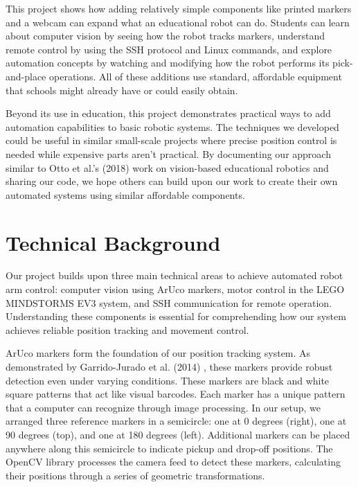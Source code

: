 \documentclass[10pt,twocolumn]{article}
\begin{document}
This project shows how adding relatively simple components like printed markers and a webcam can expand what an educational robot can do. Students can learn about computer vision by seeing how the robot tracks markers, understand remote control by using the SSH protocol and Linux commands, and explore automation concepts by watching and modifying how the robot performs its pick-and-place operations. All of these additions use standard, affordable equipment that schools might already have or could easily obtain.

Beyond its use in education, this project demonstrates practical ways to add automation capabilities to basic robotic systems. The techniques we developed could be useful in similar small-scale projects where precise position control is needed while expensive parts aren't practical. By documenting our approach similar to Otto et al.'s (2018) \cite{otto2018teaching} work on vision-based educational robotics and sharing our code, we hope others can build upon our work to create their own automated systems using similar affordable components.



\section{Technical Background}
Our project builds upon three main technical areas to achieve automated robot arm control: computer vision using ArUco markers, motor control in the LEGO MINDSTORMS EV3 system, and SSH communication for remote operation. Understanding these components is essential for comprehending how our system achieves reliable position tracking and movement control.

ArUco markers form the foundation of our position tracking system. As demonstrated by Garrido-Jurado et al. (2014) \cite{garrido2014automatic}, these markers provide robust detection even under varying conditions. These markers are black and white square patterns that act like visual barcodes. Each marker has a unique pattern that a computer can recognize through image processing. In our setup, we arranged three reference markers in a semicircle: one at 0 degrees (right), one at 90 degrees (top), and one at 180 degrees (left). Additional markers can be placed anywhere along this semicircle to indicate pickup and drop-off positions. The OpenCV library processes the camera feed to detect these markers, calculating their positions through a series of geometric transformations.
\end{document}
